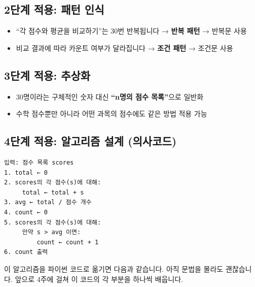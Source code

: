 \documentclass[
  korean,
  11pt,
  a4paper,
  DIV=11,
  numbers=noendperiod]{scrreprt}
\providecommand{\tightlist}{%
  \setlength{\itemsep}{0pt}\setlength{\parskip}{0pt}}
\begin{document}
\subsection{2단계 적용: 패턴
인식}\label{uxb2e8uxacc4-uxc801uxc6a9-uxd328uxd134-uxc778uxc2dd}

\begin{itemize}
\tightlist
\item
  ``각 점수와 평균을 비교하기''는 30번 반복됩니다 → \textbf{반복 패턴} →
  반복문 사용
\item
  비교 결과에 따라 카운트 여부가 달라집니다 → \textbf{조건 패턴} →
  조건문 사용
\end{itemize}

\subsection{3단계 적용:
추상화}\label{uxb2e8uxacc4-uxc801uxc6a9-uxcd94uxc0c1uxd654}

\begin{itemize}
\tightlist
\item
  30명이라는 구체적인 숫자 대신 \textbf{``n명의 점수 목록''}으로 일반화
\item
  수학 점수뿐만 아니라 어떤 과목의 점수에도 같은 방법 적용 가능
\end{itemize}

\subsection{4단계 적용: 알고리즘 설계
(의사코드)}\label{uxb2e8uxacc4-uxc801uxc6a9-uxc54cuxace0uxb9acuxc998-uxc124uxacc4-uxc758uxc0acuxcf54uxb4dc}

\begin{verbatim}
입력: 점수 목록 scores
1. total ← 0
2. scores의 각 점수(s)에 대해:
     total ← total + s
3. avg ← total / 점수 개수
4. count ← 0
5. scores의 각 점수(s)에 대해:
     만약 s > avg 이면:
         count ← count + 1
6. count 출력
\end{verbatim}

이 알고리즘을 파이썬 코드로 옮기면 다음과 같습니다. 아직 문법을 몰라도
괜찮습니다. 앞으로 4주에 걸쳐 이 코드의 각 부분을 하나씩 배웁니다.
\end{document}

